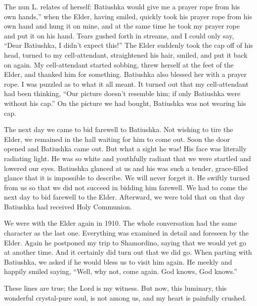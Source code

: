 \begin{longquote}{The nun L. relates of herself: }
Batiushka would give me a prayer rope from his own hands,'' when the Elder, having smiled, quickly took his prayer rope from his own hand and hung it on mine, and at the same time he took my prayer rope and put it on his hand. Tears gushed forth in streams, and I could only say, ``Dear Batiushka, I didn't expect this!'' The Elder suddenly took the cap off of his head, turned to my cell-attendant, straightened his hair, smiled, and put it back on again. My cell-attendant started sobbing, threw herself at the feet of the Elder, and thanked him for something. Batiushka also blessed her with a prayer rope. I was puzzled as to what it all meant. It turned out that my cell-attendant had been thinking, ``Our picture doesn't resemble him; if only Batiushka were without his cap.'' On the picture we had bought, Batiushka was not wearing his cap.

The next day we came to bid farewell to Batiushka. Not wishing to tire the Elder, we remained in the hall waiting for him to come out. Soon the door opened and Batiushka came out. But what a sight he was! His face was literally radiating light. He was so white and youthfully radiant that we were startled and lowered our eyes. Batiushka glanced at us and his was such a tender, grace-filled glance that it is impossible to describe. We will never forget it. He swiftly turned from us so that we did not succeed in bidding him farewell. We had to come the next day to bid farewell to the Elder. Afterward, we were told that on that day Batiushka had received Holy Communion.

We were with the Elder again in 1910. The whole conversation had the same character as the last one. Everything was examined in detail and foreseen by the Elder. Again he postponed my trip to Shamordino, saying that we would yet go at another time. And it certainly did turn out that we did go. When parting with Batiushka, we asked if he would bless us to visit him again. He meekly and happily smiled saying, ``Well, why not, come again. God knows, God knows.''

These lines are true; the Lord is my witness. But now, this luminary, this wonderful crystal-pure soul, is not among us, and my heart is painfully crushed.
\end{longquote}


